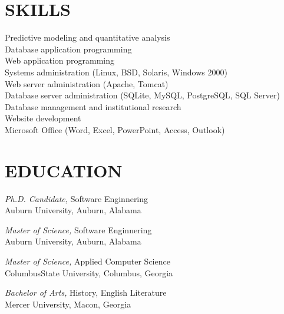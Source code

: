 \documentclass[margin, 11pt]{res} %
\begin{document}
\begin{resume}

 
\section{SKILLS}  

Predictive modeling and quantitative analysis\\
Database application programming\\
Web application programming\\
Systems administration (Linux, BSD, Solaris, Windows 2000)\\
Web server administration (Apache, Tomcat)\\
Database server administration (SQLite, MySQL, PostgreSQL, SQL Server)\\
Database management and institutional research\\
Website development\\
Microsoft Office (Word, Excel, PowerPoint, Access, Outlook)\\


\section{EDUCATION}

{\it Ph.D. Candidate,} Software Enginnering\\
Auburn University, Auburn, Alabama

{\it Master of Science,} Software Enginnering\\
Auburn University, Auburn, Alabama

{\it Master of Science,} Applied Computer Science\\
ColumbusState University, Columbus, Georgia

{\it Bachelor of Arts,} History, English Literature\\
Mercer University, Macon, Georgia

 

\end{resume}
\end{document}
